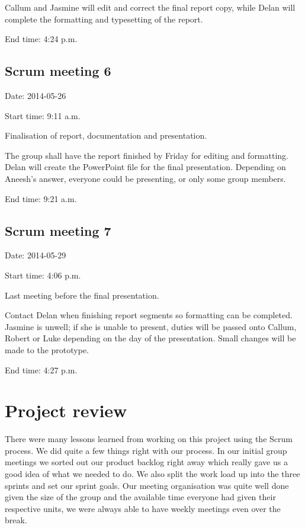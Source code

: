 \documentclass[a4paper,titlepage,12pt]{article}
\let\stdsection\section
\renewcommand\section{\newpage\stdsection}
\begin{document}
Callum and Jasmine will edit and correct the final report copy, while Delan
will complete the formatting and typesetting of the report.

End time: 4:24 p.m.

\subsection{Scrum meeting 6}

Date: 2014-05-26

Start time: 9:11 a.m.

Finalisation of report, documentation and presentation.

The group shall have the report finished by Friday for editing and formatting.
Delan will create the PowerPoint file for the final presentation. Depending on
Aneesh's answer, everyone could be presenting, or only some group members.

End time: 9:21 a.m.

\subsection{Scrum meeting 7}

Date: 2014-05-29

Start time: 4:06 p.m.

Last meeting before the final presentation.

Contact Delan when finishing report segments so formatting can be completed.
Jasmine is unwell; if she is unable to present, duties will be passed onto
Callum, Robert or Luke depending on the day of the presentation. Small changes
will be made to the prototype.

End time: 4:27 p.m.

\section{Project review}

There were many lessons learned from working on this project using the Scrum
process. We did quite a few things right with our process. In our initial group
meetings we sorted out our product backlog right away which really gave us a
good idea of what we needed to do. We also split the work load up into the
three sprints and set our sprint goals. Our meeting organisation was quite well
done given the size of the group and the available time everyone had given
their respective units, we were always able to have weekly meetings even over
the break.
\end{document}
